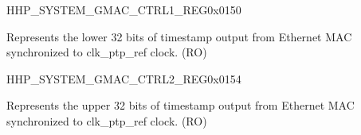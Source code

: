 \begin{register}{H}{HP\_SYSTEM\_GMAC\_CTRL1\_REG}{0x0150}\label{regdesc:HPSYSTEMGMACCTRL1REG}
%
\regnewline%
\begin{regdesc}\begin{reglist}
\label{fielddesc:HPSYSTEMSYSPTPTIMESTAMPL}\item [HP\_SYSTEM\_SYS\_PTP\_TIMESTAMP\_L] Represents the lower 32 bits of timestamp output from Ethernet MAC synchronized to clk\_ptp\_ref clock. (RO)
\end{reglist}\end{regdesc}
\end{register}


\begin{register}{H}{HP\_SYSTEM\_GMAC\_CTRL2\_REG}{0x0154}\label{regdesc:HPSYSTEMGMACCTRL2REG}
%
\regnewline%
\begin{regdesc}\begin{reglist}
\label{fielddesc:HPSYSTEMSYSPTPTIMESTAMPH}\item [HP\_SYSTEM\_SYS\_PTP\_TIMESTAMP\_H] Represents the upper 32 bits of timestamp output from Ethernet MAC synchronized to clk\_ptp\_ref clock. (RO)
\end{reglist}\end{regdesc}
\end{register}



